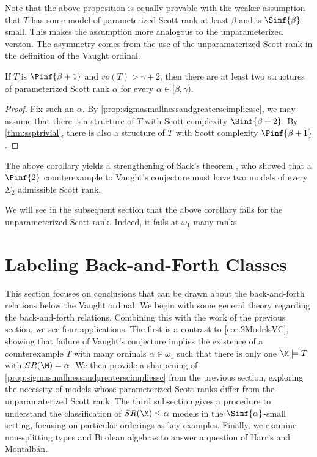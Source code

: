 \documentclass[10pt,a4paper]{amsart}
\renewcommand{\-}{\text{-}}
\begin{document}
Note that the above proposition is equally provable with the weaker assumption that $T$ has some model of parameterized Scott rank at least $\beta$ and is $\Sinf{\beta}$ small.
This makes the assumption more analogous to the unparameterized version.
The asymmetry comes from the use of the unparamaterized Scott rank in the definition of the Vaught ordinal. 

\begin{corollary}
If $T$ is $\Pinf{\beta+1}$ and $vo(T)>\gamma+2$, then there are at least two structures of parameterized Scott rank $\alpha$ for every $\alpha\in[\beta,\gamma)$.
\end{corollary}

\begin{proof}
Fix such an $\alpha$. By \cref{prop:sigmasmallnessandgreaterscimpliessc}, we may assume that there is a structure of $T$ with Scott complexity $\Sinf{\beta+2}$. By \cref{thm:ssptrivial}, there is also a structure of $T$ with Scott complexity $\Pinf{\beta+1}$.
\end{proof}

The above corollary yields a strengthening of Sack's theorem \cite{Sac83}, who showed that a $\Pinf{2}$ counterexample to Vaught's conjecture must have two models of every $\Sigma_2^1$ admissible Scott rank.

\twomodelsvc

We will see in the subsequent section that the above corollary fails for the unparameterized Scott rank.
Indeed, it fails at $\omega_1$ many ranks.



\section{Labeling Back-and-Forth Classes}
This section focuses on conclusions that can be drawn about the back-and-forth relations below the Vaught ordinal.
We begin with some general theory regarding the back-and-forth relations.
Combining this with the work of the previous section, we see four applications.
The first is a contrast to \cref{cor:2ModelsVC}, showing that failure of Vaught's conjecture implies the existence of a counterexample $T$ with many ordinals $\alpha\in\omega_1$ such that there is only one $\M\models T$ with $SR(\M)=\alpha$.
We then provide a sharpening of \cref{prop:sigmasmallnessandgreaterscimpliessc} from the previous section, exploring the necessity of models whose parameterized Scott ranks differ from the unparamaterized Scott rank.
The third subsection gives a procedure to understand the classification of $SR(\M)\leq\alpha$ models in the $\Sinf{\alpha}$-small setting, focusing on particular orderings as key examples.
Finally, we examine non-splitting types and Boolean algebras to answer a question of Harris and Montalb\'an.
\end{document}
